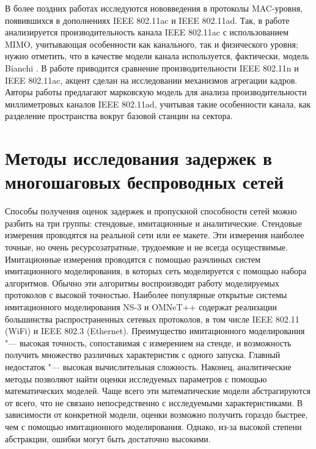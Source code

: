 В более поздних работах исследуются нововведения в протоколы MAC-уровня, появившихся в дополнениях IEEE 802.11ac и IEEE 802.11ad. Так, в работе \cite{Khan2017} анализируется производительность канала IEEE 802.11ac с использованием MIMO, учитывающая особенности как канального, так и физического уровня; нужно отметить, что в качестве модели канала используется, фактически, модель Bianchi \cite{Bianchi2000}. В работе \cite{Ong2011} приводится сравнение производительности IEEE 802.11n и IEEE 802.11ac, акцент сделан на исследовании механизмов агрегации кадров. Авторы работы \cite{Chandra2017} предлагают марковскую модель для анализа производительности миллиметровых каналов IEEE 802.11ad, учитывая такие особенности канала, как разделение пространства вокруг базовой станции на сектора.


\section{Методы исследования задержек в многошаговых беспроводных сетей}\label{sec:ch1_qs}

Способы получения оценок задержек и пропускной способности сетей можно разбить на три группы: стендовые, имитационные и аналитические. Стендовые измерения проводятся на реальной сети или ее макете. Эти измерения наиболее точные, но очень ресурсозатратные, трудоемкие и не всегда осуществимые. Имитационные измерения проводятся с помощью разчлиных систем имитационного моделирования, в которых сеть моделируется с помощью набора алгоритмов. Обычно эти алгоритмы воспроизводят работу моделируемых протоколов с высокой точностью. Наиболее популярные открытые системы имитационного моделирования NS-3 и OMNeT++ содержат реализации большинства распространенных сетевых протоколов, в том числе IEEE 802.11 (WiFi) и IEEE 802.3 (Ethernet). Преимущество имитационного моделирования "--- высокая точность, сопоставимая с измерением на стенде, и возможность получить множество различных характеристик с одного запуска. Главный недостаток "--- высокая вычислительная сложность. Наконец, аналитические методы позволяют найти оценки исследуемых параметров с помощью математических моделей. Чаще всего эти математические модели абстрагируются от всего, что не связано непосредственно с исследуемыми характеристиками. В зависимости от конкретной модели, оценки возможно получить гораздо быстрее, чем с помощью имитационного моделирования. Однако, из-за высокой степени абстракции, ошибки могут быть достаточно высокими.

